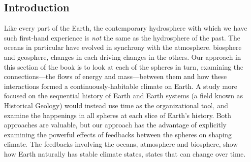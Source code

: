 \documentclass[amstex,12pt]{book}
\begin{document}
{\subsection{Introduction}
Like every part of the Earth, the contemporary hydrosphere with which we have such first-hand experience is \emph{not} the same as the hydrosphere of the past. The oceans in particular have evolved in synchrony with the atmosphere. biosphere and geosphere, changes in each driving changes in the others. Our approach in this section of the book is to look at each of the spheres in turn, examining the connections---the flows of energy and mass---between them and how these interactions formed a continuously-habitable climate on Earth. A study more focused on the sequential history of Earth and Earth systems (a field known as Historical Geology) would instead use time as the organizational tool, and examine the happenings in all spheres at each slice of Earth's history. Both approaches are valuable, but our approach has the advantage of explicitly examining the powerful effects of feedbacks between the spheres on shaping climate. The feedbacks involving the oceans, atmosphere and biosphere, show how Earth naturally has stable climate states, states that can change over time.
}
\end{document}
